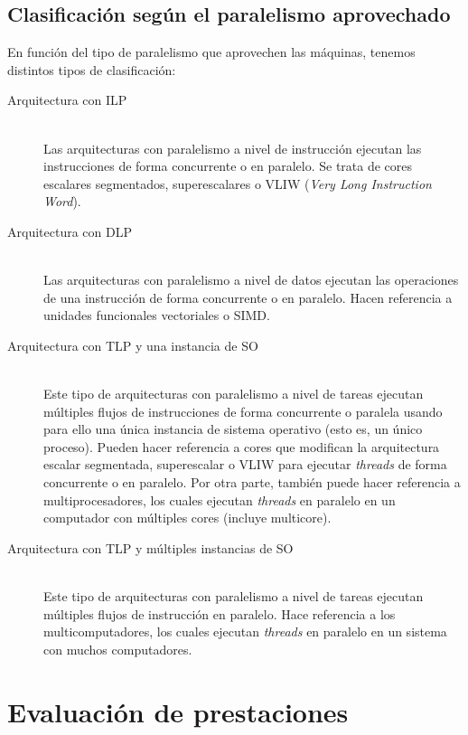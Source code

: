 \subsection{Clasificación según el paralelismo aprovechado}
En función del tipo de paralelismo que aprovechen las máquinas, tenemos distintos tipos de clasificación:
\begin{description}
    \item [Arquitectura con ILP]~\\
        Las arquitecturas con paralelismo a nivel de instrucción ejecutan las instrucciones de forma concurrente o en paralelo. Se trata de cores escalares segmentados, superescalares o VLIW (\emph{Very Long Instruction Word}).
    \item [Arquitectura con DLP]~\\
        Las arquitecturas con paralelismo a nivel de datos ejecutan las operaciones de una instrucción de forma concurrente o en paralelo. Hacen referencia a unidades funcionales vectoriales o SIMD.
    \item [Arquitectura con TLP y una instancia de SO]~\\
        Este tipo de arquitecturas con paralelismo a nivel de tareas ejecutan múltiples flujos de instrucciones de forma concurrente o paralela usando para ello una única instancia de sistema operativo (esto es, un único proceso). Pueden hacer referencia a cores que modifican la arquitectura escalar segmentada, superescalar o VLIW para ejecutar \emph{threads} de forma concurrente o en paralelo. Por otra parte, también puede hacer referencia a multiprocesadores, los cuales ejecutan \emph{threads} en paralelo en un computador con múltiples cores (incluye multicore).
    \item [Arquitectura con TLP y múltiples instancias de SO]~\\
        Este tipo de arquitecturas con paralelismo a nivel de tareas ejecutan múltiples flujos de instrucción en paralelo. Hace referencia a los multicomputadores, los cuales ejecutan \emph{threads} en paralelo en un sistema con muchos computadores.
\end{description}

\newpage
\section{Evaluación de prestaciones}
